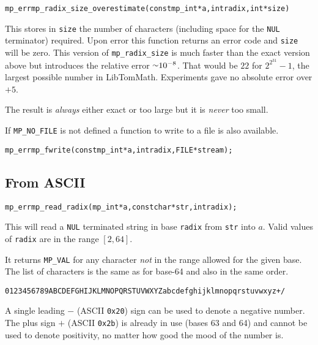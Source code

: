 \documentclass[synpaper]{book}
\def\approx{\raisebox{0.2ex}{\mbox{\small $\sim$}}}
\begin{document}
\begin{alltt}
mp_err mp_radix_size_overestimate (const mp_int *a, int radix, int *size)
\end{alltt}
This stores in \texttt{size} the number of characters (including space for the \texttt{NUL}
terminator) required. Upon error this function returns an error code and \texttt{size} will be
zero. This version of \texttt{mp\_radix\_size} is much faster than the exact version above but
introduces the relative error $\approx 10^{-8}$. That would be $22$ for $2^{2^{31}}-1$, the
largest possible number in LibTomMath. Experiments gave no absolute error over $+5$.

The result is \emph{always} either exact or too large but it is \emph{never} too small.


If \texttt{MP\_NO\_FILE} is not defined a function to write to a file is also available.

\begin{alltt}
mp_err mp_fwrite(const mp_int *a, int radix, FILE *stream);
\end{alltt}

\subsection{From ASCII}
\begin{alltt}
mp_err mp_read_radix (mp_int *a, const char *str, int radix);
\end{alltt}
This will read a \texttt{NUL} terminated string in base \texttt{radix} from \texttt{str} into $a$.
Valid values of \texttt{radix} are in the range $[2, 64]$.

It returns \texttt{MP\_VAL} for any character {\em not} in the range allowed for the given base.
The list of characters is the same as for base-64 and also in the same order.
\begin{alltt}
0123456789ABCDEFGHIJKLMNOPQRSTUVWXYZabcdefghijklmnopqrstuvwxyz+/
\end{alltt}

A single leading $-$ (ASCII \texttt{0x20}) sign can be used to denote a negative number. The
plus sign $+$ (ASCII \texttt{0x2b}) is already in use (bases 63 and 64) and cannot be used
to denote positivity, no matter how good the mood of the number is.
\end{document}
